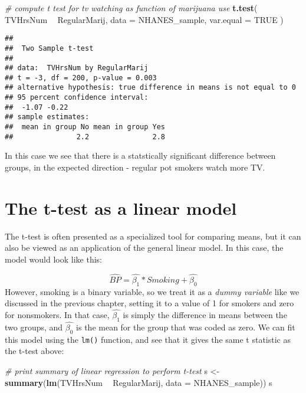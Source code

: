 \documentclass[]{book}
\newenvironment{Shaded}{\begin{snugshade}}{\end{snugshade}}
\newcommand{\KeywordTok}[1]{\textcolor[rgb]{0.13,0.29,0.53}{\textbf{#1}}}
\newcommand{\DataTypeTok}[1]{\textcolor[rgb]{0.13,0.29,0.53}{#1}}
\newcommand{\StringTok}[1]{\textcolor[rgb]{0.31,0.60,0.02}{#1}}
\newcommand{\CommentTok}[1]{\textcolor[rgb]{0.56,0.35,0.01}{\textit{#1}}}
\newcommand{\OtherTok}[1]{\textcolor[rgb]{0.56,0.35,0.01}{#1}}
\newcommand{\OperatorTok}[1]{\textcolor[rgb]{0.81,0.36,0.00}{\textbf{#1}}}
\newcommand{\NormalTok}[1]{#1}
\theoremstyle{definition}
\theoremstyle{definition}
\theoremstyle{definition}
\theoremstyle{remark}
\begin{document}
\begin{Shaded}
\begin{Highlighting}[]
\CommentTok{# compute t test for tv watching as function of marijuana use}
\KeywordTok{t.test}\NormalTok{(}
\NormalTok{  TVHrsNum }\OperatorTok{~}\StringTok{ }\NormalTok{RegularMarij,}
  \DataTypeTok{data =}\NormalTok{ NHANES_sample,}
  \DataTypeTok{var.equal =} \OtherTok{TRUE}
\NormalTok{)}
\end{Highlighting}
\end{Shaded}

\begin{verbatim}
## 
##  Two Sample t-test
## 
## data:  TVHrsNum by RegularMarij
## t = -3, df = 200, p-value = 0.003
## alternative hypothesis: true difference in means is not equal to 0
## 95 percent confidence interval:
##  -1.07 -0.22
## sample estimates:
##  mean in group No mean in group Yes 
##               2.2               2.8
\end{verbatim}

In this case we see that there is a statstically significant difference
between groups, in the expected direction - regular pot smokers watch
more TV.

\section{The t-test as a linear
model}\label{the-t-test-as-a-linear-model}

The t-test is often presented as a specialized tool for comparing means,
but it can also be viewed as an application of the general linear model.
In this case, the model would look like this:

\[
\hat{BP} = \hat{\beta_1}*Smoking + \hat{\beta_0}
\] However, smoking is a binary variable, so we treat it as a
\emph{dummy variable} like we discussed in the previous chapter, setting
it to a value of 1 for smokers and zero for nonsmokers. In that case,
\(\hat{\beta_1}\) is simply the difference in means between the two
groups, and \(\hat{\beta_0}\) is the mean for the group that was coded
as zero. We can fit this model using the \texttt{lm()} function, and see
that it gives the same t statistic as the t-test above:

\begin{Shaded}
\begin{Highlighting}[]
\CommentTok{# print summary of linear regression to perform t-test}
\NormalTok{s <-}\StringTok{ }\KeywordTok{summary}\NormalTok{(}\KeywordTok{lm}\NormalTok{(TVHrsNum }\OperatorTok{~}\StringTok{ }\NormalTok{RegularMarij, }\DataTypeTok{data =}\NormalTok{ NHANES_sample))}
\NormalTok{s}
\end{Highlighting}
\end{Shaded}
\end{document}
